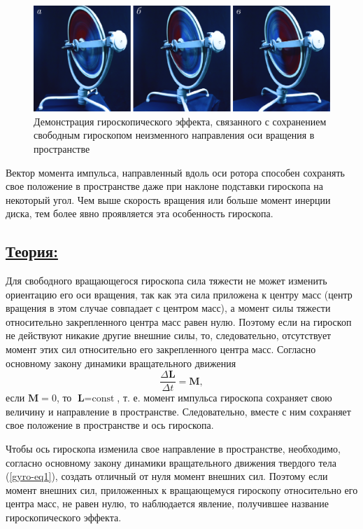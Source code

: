 \documentclass[14pt,a4paper,oneside]{extarticle}	%
\begin{document}
		\begin{figure}[H]
		\centering 		
		\includegraphics[width=0.9\linewidth]{gyro-2.png}		
		\caption{Демонстрация гироскопического эффекта, связанного с сохранением свободным гироскопом неизменного направления оси вращения в пространстве}
		\label{gyro-2}	
	\end{figure}

Вектор момента импульса, направленный вдоль оси ротора способен сохранять свое положение в пространстве даже при наклоне подставки гироскопа на некоторый угол.
Чем выше скорость вращения или больше момент инерции диска, тем более явно проявляется эта особенность гироскопа.

	\subsection*{\underline{Теория:}}
	
	Для свободного вращающегося гироскопа сила тяжести не может изменить ориентацию его оси вращения, так как эта сила приложена к центру масс (центр вращения в этом случае совпадает с центром масс), а момент силы тяжести относительно закрепленного центра масс равен нулю.
	Поэтому если на гироскоп не действуют никакие другие внешние силы, то, следовательно, отсутствует момент этих сил относительно его закрепленного центра масс.
	Согласно основному закону динамики вращательного движения
\begin{equation}\label{gyro-eq1}
	\frac{\Delta \textbf{L}}{\Delta t} = \textbf{M},
	\end{equation} 
	если $ \textbf{M}=0 $, то $ \textbf{L} = \text{const} $, т. е. момент импульса гироскопа сохраняет свою величину и направление в пространстве.
	Следовательно, вместе с ним сохраняет свое положение в пространстве и ось гироскопа.
		
	Чтобы ось гироскопа изменила свое направление в пространстве, необходимо, согласно основному закону динамики вращательного движения твердого тела (\ref{gyro-eq1}), создать отличный от нуля момент внешних сил.
	Поэтому если момент внешних сил, приложенных к вращающемуся гироскопу относительно его центра масс, не равен нулю, то наблюдается явление, получившее название гироскопического эффекта.
	
\end{document}
